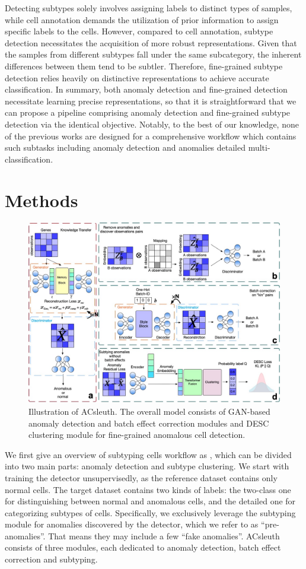 \documentclass{article}
\begin{document}
Detecting subtypes solely involves assigning labels to distinct types of samples, 
while cell annotation demands the utilization of prior information to assign specific 
labels to the cells. However, compared to cell annotation, subtype detection necessitates 
the acquisition of more robust representations. Given that the samples from different 
subtypes fall under the same subcategory, the inherent differences between them tend to 
be subtler. Therefore, fine-grained subtype detection relies heavily on distinctive representations to 
achieve accurate classification. In summary, both anomaly detection and fine-grained detection 
necessitate learning precise representations, so that it is straightforward that we can 
propose a pipeline comprising anomaly detection and fine-grained subtype detection via the identical objective. 
Notably, to the best of our knowledge, none of the previous works are designed for a 
comprehensive workflow which contains such subtasks including anomaly detection and 
anomalies detailed multi-classification.


\section{Methods}
\begin{figure}
    \centering
    \includegraphics[scale=0.20]{Framework.jpg}
    \caption{Illustration of ACsleuth. The overall model consists of GAN-based anomaly detection and batch effect correction modules and DESC clustering module for fine-grained anomalous cell detection.}
    \label{fig:workflow}
\end{figure}
We first give an overview of subtyping cells workflow as , which can be divided into two main 
parts: anomaly detection and subtype clustering. We start with training the detector 
unsupervisedly, as the reference dataset contains only normal cells. The target dataset 
contains two kinds of labels: the two-class one for distinguishing between normal and 
anomalous cells, and the detailed one for categorizing subtypes of cells. Specifically, 
we exclusively leverage the subtyping module for anomalies discovered by the detector, 
which we refer to as “pre-anomalies”. That means they may include a few “fake anomalies”. 
ACsleuth consists of three modules, each dedicated to anomaly detection, batch effect correction and subtyping.
\end{document}
